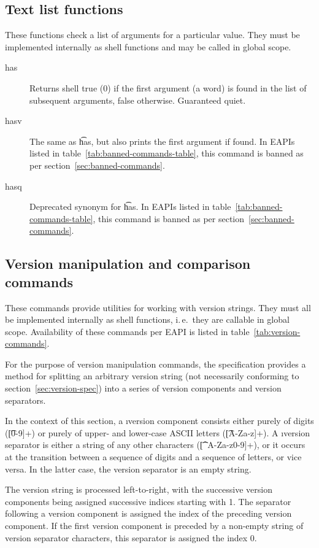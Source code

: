 \subsection{Text list functions}
These functions check a list of arguments for a particular value. They must be implemented
internally as shell functions and may be called in global scope.
\nobreakpar
\begin{description}
\item[has] Returns shell true (0) if the first argument (a word) is found in the list of subsequent
    arguments, false otherwise. Guaranteed quiet.
\item[hasv] The same as \t{has}, but also prints the first argument if found.
    In EAPIs listed in table~\ref{tab:banned-commands-table}, this command is banned as per
    section~\ref{sec:banned-commands}.
\item[hasq] Deprecated synonym for \t{has}.
    In EAPIs listed in table~\ref{tab:banned-commands-table}, this command is banned as per
    section~\ref{sec:banned-commands}.
\end{description}

\subsection{Version manipulation and comparison commands}
These commands provide utilities for working with version strings. They must all be implemented
internally as shell functions, i.\,e.\ they are callable in global scope. Availability of these
commands per EAPI is listed in table~\ref{tab:version-commands}.

For the purpose of version manipulation commands, the specification provides a method for splitting
an arbitrary version string (not necessarily conforming to section~\ref{sec:version-spec}) into
a series of version components and version separators.

In the context of this section, a \i{version component} consists either purely of digits
(\t{[0-9]+}) or purely of upper- and lower-case ASCII letters (\t{[A-Za-z]+}). A \i{version
separator} is either a string of any other characters (\t{[\textasciicircum A-Za-z0-9]+}), or it
occurs at the transition between a sequence of digits and a sequence of letters, or vice versa.
In the latter case, the version separator is an empty string.

The version string is processed left-to-right, with the successive version components being assigned
successive indices starting with 1. The separator following a version component is assigned
the index of the preceding version component. If the first version component is preceded by
a non-empty string of version separator characters, this separator is assigned the index 0.

